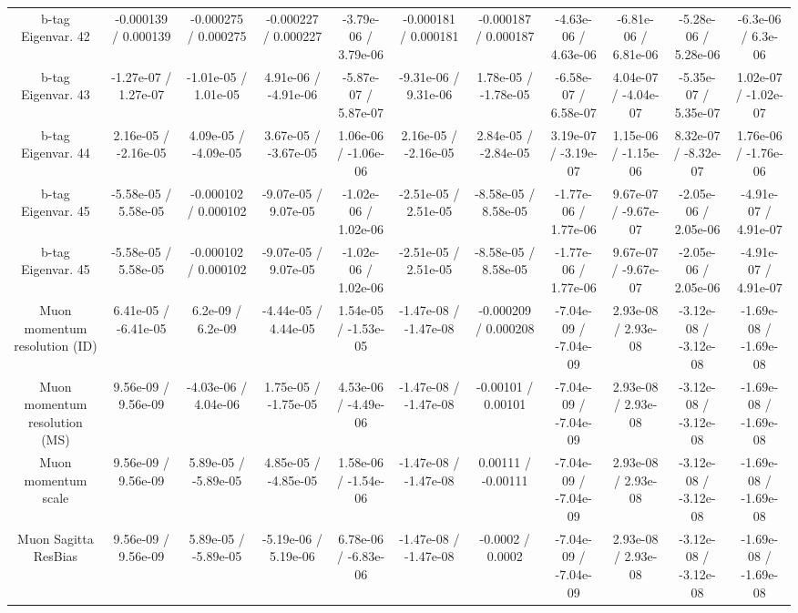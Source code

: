 \begin{table}[htbp]
\begin{center}
\begin{tabular}{|c|c|c|c|c|c|c|c|c|c|c|}
  b-tag Eigenvar. 42 & -0.000139 / 0.000139 & -0.000275 / 0.000275 & -0.000227 / 0.000227 & -3.79e-06 / 3.79e-06 & -0.000181 / 0.000181 & -0.000187 / 0.000187 & -4.63e-06 / 4.63e-06 & -6.81e-06 / 6.81e-06 & -5.28e-06 / 5.28e-06 & -6.3e-06 / 6.3e-06 \\ 
  b-tag Eigenvar. 43 & -1.27e-07 / 1.27e-07 & -1.01e-05 / 1.01e-05 & 4.91e-06 / -4.91e-06 & -5.87e-07 / 5.87e-07 & -9.31e-06 / 9.31e-06 & 1.78e-05 / -1.78e-05 & -6.58e-07 / 6.58e-07 & 4.04e-07 / -4.04e-07 & -5.35e-07 / 5.35e-07 & 1.02e-07 / -1.02e-07 \\ 
  b-tag Eigenvar. 44 & 2.16e-05 / -2.16e-05 & 4.09e-05 / -4.09e-05 & 3.67e-05 / -3.67e-05 & 1.06e-06 / -1.06e-06 & 2.16e-05 / -2.16e-05 & 2.84e-05 / -2.84e-05 & 3.19e-07 / -3.19e-07 & 1.15e-06 / -1.15e-06 & 8.32e-07 / -8.32e-07 & 1.76e-06 / -1.76e-06 \\ 
  b-tag Eigenvar. 45 & -5.58e-05 / 5.58e-05 & -0.000102 / 0.000102 & -9.07e-05 / 9.07e-05 & -1.02e-06 / 1.02e-06 & -2.51e-05 / 2.51e-05 & -8.58e-05 / 8.58e-05 & -1.77e-06 / 1.77e-06 & 9.67e-07 / -9.67e-07 & -2.05e-06 / 2.05e-06 & -4.91e-07 / 4.91e-07 \\ 
  b-tag Eigenvar. 45 & -5.58e-05 / 5.58e-05 & -0.000102 / 0.000102 & -9.07e-05 / 9.07e-05 & -1.02e-06 / 1.02e-06 & -2.51e-05 / 2.51e-05 & -8.58e-05 / 8.58e-05 & -1.77e-06 / 1.77e-06 & 9.67e-07 / -9.67e-07 & -2.05e-06 / 2.05e-06 & -4.91e-07 / 4.91e-07 \\ 
  Muon momentum resolution (ID) & 6.41e-05 / -6.41e-05 & 6.2e-09 / 6.2e-09 & -4.44e-05 / 4.44e-05 & 1.54e-05 / -1.53e-05 & -1.47e-08 / -1.47e-08 & -0.000209 / 0.000208 & -7.04e-09 / -7.04e-09 & 2.93e-08 / 2.93e-08 & -3.12e-08 / -3.12e-08 & -1.69e-08 / -1.69e-08 \\ 
  Muon momentum resolution (MS) & 9.56e-09 / 9.56e-09 & -4.03e-06 / 4.04e-06 & 1.75e-05 / -1.75e-05 & 4.53e-06 / -4.49e-06 & -1.47e-08 / -1.47e-08 & -0.00101 / 0.00101 & -7.04e-09 / -7.04e-09 & 2.93e-08 / 2.93e-08 & -3.12e-08 / -3.12e-08 & -1.69e-08 / -1.69e-08 \\ 
  Muon momentum scale & 9.56e-09 / 9.56e-09 & 5.89e-05 / -5.89e-05 & 4.85e-05 / -4.85e-05 & 1.58e-06 / -1.54e-06 & -1.47e-08 / -1.47e-08 & 0.00111 / -0.00111 & -7.04e-09 / -7.04e-09 & 2.93e-08 / 2.93e-08 & -3.12e-08 / -3.12e-08 & -1.69e-08 / -1.69e-08 \\ 
  Muon Sagitta ResBias & 9.56e-09 / 9.56e-09 & 5.89e-05 / -5.89e-05 & -5.19e-06 / 5.19e-06 & 6.78e-06 / -6.83e-06 & -1.47e-08 / -1.47e-08 & -0.0002 / 0.0002 & -7.04e-09 / -7.04e-09 & 2.93e-08 / 2.93e-08 & -3.12e-08 / -3.12e-08 & -1.69e-08 / -1.69e-08 \\ 

\end{tabular}
\end{center}
\end{table}
